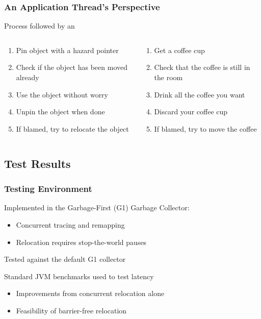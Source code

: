 \documentclass{beamer}
\newcommand{\linespace}{\vskip 0.25cm}
\begin{document}
\begin{frame}

\frametitle{An Application Thread's Perspective}

Process followed by an \color{red}{application thread}\color{black}{:}
\linespace

\begin{columns}
\begin{column}{0.5\textwidth}
\begin{enumerate}
\item Pin object with a hazard pointer
\item Check if the object has been moved already
\item Use the object without worry
\item Unpin the object when done
\item If blamed, try to relocate the object
\end{enumerate}
\end{column}

\begin{column}{0.5\textwidth}
\begin{enumerate}
\item Get a coffee cup
\item Check that the coffee is still in the room
\item Drink all the coffee you want
\item Discard your coffee cup
\item If blamed, try to move the coffee
\end{enumerate}
\end{column}
\end{columns}

\end{frame}



\subsection*{Test Results}

\begin{frame}

\frametitle{Testing Environment}

Implemented in the Garbage-First (G1) Garbage Collector:
\begin{itemize}
\item Concurrent tracing and remapping
\item Relocation requires stop-the-world pauses
\end{itemize}

\linespace
\linespace

Tested against the default G1 collector

\linespace
\linespace

Standard JVM benchmarks used to test latency
\begin{itemize}
\item Improvements from concurrent relocation alone
\item Feasibility of barrier-free relocation
\end{itemize}

\end{frame}
\end{document}
